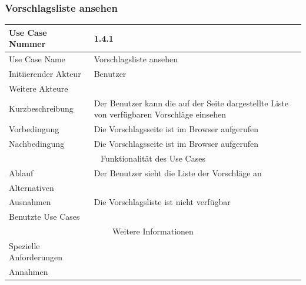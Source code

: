 \documentclass[10pt,a4paper]{article}
\begin{document}
	\subsubsection{Vorschlagsliste ansehen}
	\begin{tabularx}{\textwidth}{|l|X|}
		\hline Use Case Nummer & 1.4.1 \\ 
		\hline Use Case Name & Vorschlagsliste ansehen \\ 
		\hline Initiierender Akteur & Benutzer \\
		\hline Weitere Akteure & \\
		\hline Kurzbeschreibung & Der Benutzer kann die auf der Seite dargestellte Liste von verf\"ugbaren Vorschl\"age einsehen \\
		\hline Vorbedingung & Die Vorschlagsseite ist im Browser aufgerufen \\
		\hline Nachbedingung & Die Vorschlagsseite ist im Browser aufgerufen \\
		\hline \multicolumn{2}{|c|}{Funktionalität des Use Cases}\\
		\hline Ablauf & Der Benutzer sieht die Liste der Vorschl\"age an\\
		\hline Alternativen &  \\
		\hline Ausnahmen & Die Vorschlagsliste ist nicht verf\"ugbar \\
		\hline Benutzte Use Cases & \\
		\hline \multicolumn{2}{|c|}{Weitere Informationen} \\
		\hline Spezielle Anforderungen &  \\
		\hline Annahmen &  \\
		\hline
	\end{tabularx}	
	
\end{document}
